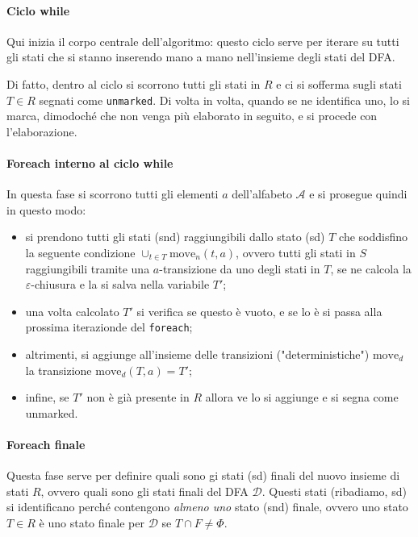 \documentclass[class=book, crop=false, oneside, 12pt]{standalone}
\begin{document}
\paragraph*{Ciclo while}
Qui inizia il corpo centrale dell'algoritmo: questo ciclo serve per iterare su tutti gli stati che si stanno inserendo mano a mano nell'insieme degli stati del DFA. 

Di fatto, dentro al ciclo si scorrono tutti gli stati in \(R\) e ci si sofferma sugli stati \(T \in R\) segnati come \texttt{unmarked}. Di volta in volta, quando se ne identifica uno, lo si marca, dimodoché che non venga più elaborato in seguito, e si procede con l'elaborazione.

\paragraph*{Foreach interno al ciclo while}
In questa fase si scorrono tutti gli elementi \(a\) dell'alfabeto \(\mathcal{A}\) e si prosegue quindi in questo modo:
\begin{itemize}
    \item si prendono tutti gli stati (snd) raggiungibili dallo stato (sd) \(T\) che soddisfino la seguente condizione \(\cup_{t \in T} \textrm{move}_n(t,a)\), ovvero tutti gli stati in \(S\) raggiungibili tramite una \(a\)-transizione da uno degli stati in \(T\), se ne calcola la \(\varepsilon\)-chiusura e la si salva nella variabile \(T'\);
    \item una volta calcolato \(T'\) si verifica se questo è vuoto, e se lo è si passa alla prossima iterazionde del \texttt{foreach};
    \item altrimenti, si aggiunge all'insieme delle transizioni ("deterministiche") \(\textrm{move}_d\) la transizione \(\textrm{move}_d(T, a) = T'\);
    \item infine, se \(T'\) non è già presente in \(R\) allora ve lo si aggiunge e si segna come unmarked.
\end{itemize}

\paragraph*{Foreach finale}
Questa fase serve per definire quali sono gi stati (sd) finali del nuovo insieme di stati \(R\), ovvero quali sono gli stati finali del DFA \(\mathcal{D}\). Questi stati (ribadiamo, sd) si identificano perché contengono \emph{almeno uno} stato (snd) finale, ovvero uno stato \(T \in R\) è uno stato finale per \(\mathcal{D}\) se \(T \cap F \neq \Phi\).
\end{document}
